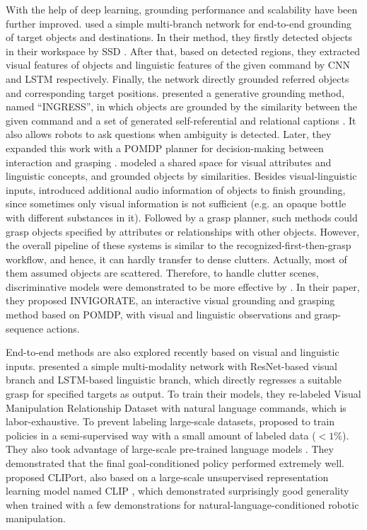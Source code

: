 \documentclass[letterpaper,10pt]{article}
\begin{document}
With the help of deep learning, grounding performance and scalability have been further improved.
\cite{hatori2018interactively} used a simple multi-branch network for end-to-end grounding of target objects and destinations.
In their method, they firstly detected objects in their workspace by SSD \cite{liu2016ssd}.
After that, based on detected regions, they extracted visual features of objects and linguistic features of the given command by CNN and LSTM \cite{hochreiter1997long} respectively.
Finally, the network directly grounded referred objects and corresponding target positions.
\cite{shridhar2018interactive} presented a generative grounding method, named ``INGRESS'', in which objects are grounded by the similarity between the given command and a set of generated self-referential \cite{johnson2016densecap} and relational captions \cite{nagaraja2016modeling}.
It also allows robots to ask questions when ambiguity is detected.
Later, they expanded this work with a POMDP planner for decision-making between interaction and grasping \cite{shridhar2020ingress}.
\cite{cohen2019grounding} modeled a shared space for visual attributes and linguistic concepts, and grounded objects by similarities.
Besides visual-linguistic inputs, \cite{wang2021audio} introduced additional audio information of objects to finish grounding, since sometimes only visual information is not sufficient (e.g. an opaque bottle with different substances in it).
Followed by a grasp planner, such methods could grasp objects specified by attributes or relationships with other objects.
However, the overall pipeline of these systems is similar to the recognized-first-then-grasp workflow, and hence, it can hardly transfer to dense clutters.
Actually, most of them assumed objects are scattered.
Therefore, to handle clutter scenes, discriminative models were demonstrated to be more effective by \cite{zhang2021invigorate}.
In their paper, they proposed INVIGORATE, an interactive visual grounding and grasping method based on POMDP, with visual and linguistic observations and grasp-sequence actions.


End-to-end methods are also explored recently based on visual and linguistic inputs.
\cite{chen2021joint} presented a simple multi-modality network with ResNet-based \cite{he2016deep} visual branch and LSTM-based \cite{hochreiter1997long} linguistic branch, which directly regresses a suitable grasp for specified targets as output.
To train their models, they re-labeled Visual Manipulation Relationship Dataset \cite{zhang2018visual} with natural language commands, which is labor-exhaustive.
To prevent labeling large-scale datasets, \cite{lynch2021language} proposed to train policies in a semi-supervised way with a small amount of labeled data ($<1\%$).
They also took advantage of large-scale pre-trained language models \cite{devlin2018bert, radford2019language}.
They demonstrated that the final goal-conditioned policy performed extremely well.
\cite{shridhar2021cliport} proposed CLIPort, also based on a large-scale unsupervised representation learning model named CLIP \cite{radford2021learning}, which demonstrated surprisingly good generality when trained with a few demonstrations for natural-language-conditioned robotic manipulation.
\end{document}
